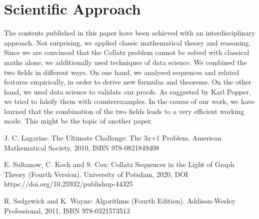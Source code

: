 \documentclass{SciPress_2015}
\begin{document}
\section{Scientific Approach}
\label{appx:scientific_approach}
The contents published in this paper have been achieved with an interdisciplinary approach. Not surprising, we applied classic mathematical theory and reasoning. Since we are convinced that the Collatz problem cannot be solved with classical maths alone, we additionally used techniques of data science. We combined the two fields in different ways. On one hand, we analysed sequences and related features empirically, in order to derive new formulas and theorems. On the other hand, we used data science to validate our proofs. As suggested by Karl Popper, we tried to falsify them with counterexamples. In the course of our work, we have learned that the combination of the two fields leads to a very efficient working mode. This might be the topic of another paper.

\begin{thebibliography}{99}

J. C. Lagarias: The Ultimate Challenge: The 3x+1 Problem. American Mathematical Society, 2010, ISBN 978-0821849408

E. Sultanow, C. Koch and S. Cox: Collatz Sequences in the Light of Graph Theory (Fourth Version). University of Potsdam, 2020, DOI https://doi.org/10.25932/publishup-44325

R. Sedgewick and K. Wayne: Algorithms (Fourth Edition). Addison-Wesley Professional, 2011, ISBN 978-0321573513

\end{thebibliography}
\end{document}
